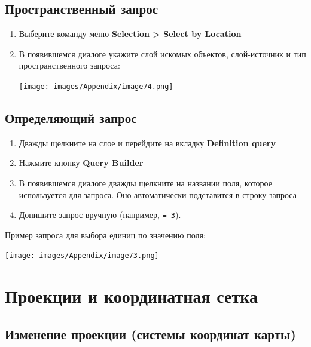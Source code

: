 \documentclass[12pt,]{book}
\begin{document}
\hypertarget{manual-select-location}{%
\section{Пространственный запрос}\label{manual-select-location}}

\begin{enumerate}
\def\labelenumi{\arabic{enumi}.}
\item
  Выберите команду меню \textbf{Selection \textgreater{} Select by Location}
\item
  В появившемся диалоге укажите слой искомых объектов, слой-источник и тип пространственного запроса:

  \texttt{[image: images/Appendix/image74.png]}
\end{enumerate}

\hypertarget{manual-select-definition}{%
\section{Определяющий запрос}\label{manual-select-definition}}

\begin{enumerate}
\def\labelenumi{\arabic{enumi}.}
\item
  Дважды щелкните на слое и перейдите на вкладку \textbf{Definition query}
\item
  Нажмите кнопку \textbf{Query Builder}
\item
  В появившемся диалоге дважды щелкните на названии поля, которое используется для запроса. Оно автоматически подставится в строку запроса
\item
  Допишите запрос вручную (например, \texttt{=\ 3}).
\end{enumerate}

Пример запроса для выбора единиц по значению поля:

\texttt{[image: images/Appendix/image73.png]}

\hypertarget{manual-projections}{%
\chapter{Проекции и координатная сетка}\label{manual-projections}}

\hypertarget{manual-projections-change}{%
\section{Изменение проекции (системы координат карты)}\label{manual-projections-change}}
\end{document}
